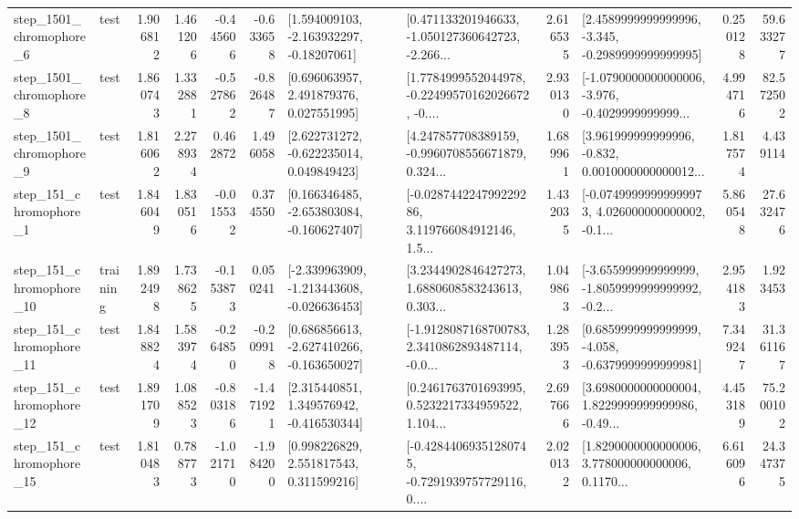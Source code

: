 \begin{tabular}{llrrrrllrlrr}
  step\_1501\_chromophore\_6 &      test &      1.906812 &    1.461206 &     -0.445606 & -0.633658 &    [1.594009103, -2.163932297, -0.18207061] &  [0.471133201946633, -1.050127360642723, -2.266... &       2.616535 &  [2.4589999999999996, -3.345, -0.2989999999999995] &            0.250128 &         59.633277 \\
  step\_1501\_chromophore\_8 &      test &      1.860743 &    1.332881 &     -0.527862 & -0.826487 &     [0.696063957, 2.491879376, 0.027551995] &  [1.7784999552044978, -0.22499570162026672, -0.... &       2.930130 &  [-1.0790000000000006, -3.976, -0.4029999999999... &            4.994716 &         82.572502 \\
  step\_1501\_chromophore\_9 &      test &      1.816062 &    2.278934 &      0.462872 &  1.496058 &    [2.622731272, -0.622235014, 0.049849423] &  [4.247857708389159, -0.9960708556671879, 0.324... &       1.689961 &  [3.961999999999996, -0.832, 0.0010000000000012... &            1.817574 &          4.439114 \\
   step\_151\_chromophore\_1 &      test &      1.846049 &    1.830516 &     -0.015532 &  0.374550 &   [0.166346485, -2.653803084, -0.160627407] &  [-0.028744224799229286, 3.119766084912146, 1.5... &       1.432035 &  [-0.07499999999999973, 4.026000000000002, -0.1... &            5.860548 &         27.632476 \\
  step\_151\_chromophore\_10 &  training &      1.892498 &    1.738625 &     -0.153873 &  0.050241 &  [-2.339963909, -1.213443608, -0.026636453] &  [3.2344902846427273, 1.6880608583243613, 0.303... &       1.049863 &  [-3.655999999999999, -1.8059999999999992, -0.2... &            2.954183 &          1.923453 \\
  step\_151\_chromophore\_11 &      test &      1.848824 &    1.583974 &     -0.264850 & -0.209918 &   [0.686856613, -2.627410266, -0.163650027] &  [-1.9128087168700783, 2.3410862893487114, -0.0... &       1.283953 &  [0.6859999999999999, -4.058, -0.6379999999999981] &            7.349247 &         31.361167 \\
  step\_151\_chromophore\_12 &      test &      1.891709 &    1.088523 &     -0.803186 & -1.471921 &    [2.315440851, 1.349576942, -0.416530344] &  [0.2461763701693995, 0.5232217334959522, 1.104... &       2.697666 &  [3.6980000000000004, 1.8229999999999986, -0.49... &            4.453189 &         75.200102 \\
  step\_151\_chromophore\_15 &      test &      1.810483 &    0.788773 &     -1.021710 & -1.984200 &     [0.998226829, 2.551817543, 0.311599216] &  [-0.42844069351280745, -0.7291939757729116, 0.... &       2.020132 &  [1.8290000000000006, 3.778000000000006, 0.1170... &            6.616096 &         24.347375 \\

\end{tabular}
